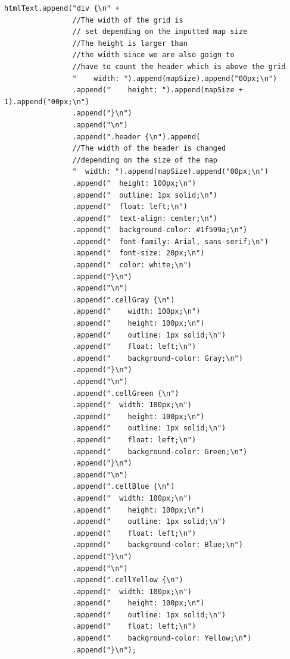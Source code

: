 \documentclass[a4paper,12pt]{extarticle}
\begin{document}
\begin{lstlisting}[caption=The initial code of the Game class, label=amb]
        htmlText.append("div {\n" +
                //The width of the grid is
                // set depending on the inputted map size
                //The height is larger than 
                //the width since we are also goign to 
                //have to count the header which is above the grid
                "    width: ").append(mapSize).append("00px;\n")
                .append("    height: ").append(mapSize + 1).append("00px;\n")
                .append("}\n")
                .append("\n")
                .append(".header {\n").append(
                //The width of the header is changed 
                //depending on the size of the map
                "  width: ").append(mapSize).append("00px;\n")
                .append("  height: 100px;\n")
                .append("  outline: 1px solid;\n")
                .append("  float: left;\n")
                .append("  text-align: center;\n")
                .append("  background-color: #1f599a;\n")
                .append("  font-family: Arial, sans-serif;\n")
                .append("  font-size: 20px;\n")
                .append("  color: white;\n")
                .append("}\n")
                .append("\n")
                .append(".cellGray {\n")
                .append("    width: 100px;\n")
                .append("    height: 100px;\n")
                .append("    outline: 1px solid;\n")
                .append("    float: left;\n")
                .append("    background-color: Gray;\n")
                .append("}\n")
                .append("\n")
                .append(".cellGreen {\n")
                .append("  width: 100px;\n")
                .append("    height: 100px;\n")
                .append("    outline: 1px solid;\n")
                .append("    float: left;\n")
                .append("    background-color: Green;\n")
                .append("}\n")
                .append("\n")
                .append(".cellBlue {\n")
                .append("  width: 100px;\n")
                .append("    height: 100px;\n")
                .append("    outline: 1px solid;\n")
                .append("    float: left;\n")
                .append("    background-color: Blue;\n")
                .append("}\n")
                .append("\n")
                .append(".cellYellow {\n")
                .append("  width: 100px;\n")
                .append("    height: 100px;\n")
                .append("    outline: 1px solid;\n")
                .append("    float: left;\n")
                .append("    background-color: Yellow;\n")
                .append("}\n");


\end{lstlisting}
\end{document}
